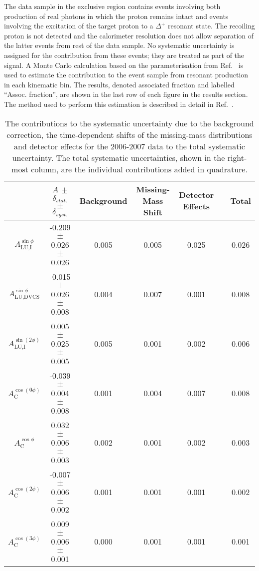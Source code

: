The data sample in the exclusive region contains events involving both
production of real photons in which the proton remains intact and
events involving the excitation of the target proton to a $\Delta^+$
resonant state. The recoiling proton is not detected and
  the calorimeter resolution does not allow separation of the latter events from rest of the data sample.
No systematic uncertainty is assigned for the contribution from these events; they are treated as part of the signal. A Monte Carlo calculation based on the parameterisation from Ref.~\cite{Bra76} is used to estimate the contribution to the event sample from resonant production in each kinematic bin. The results, denoted associated fraction and labelled ``Assoc. fraction'', are shown in the last row of each figure in the results section. The method used to perform this estimation is described in detail in
Ref.~\cite{Air08}.

\begin{table}
 \begin{center}
\resizebox{\textwidth}{!} {
 \begin{tabular}{|c|c|c|c|c|c|c|}
  \hline
 & $A$ $\pm$ $\delta_{stat.}$ $\pm$ $\delta_{syst.}$ & Background & Missing-Mass Shift  & Detector Effects & & Total \\
  \hline
  \hline
  $A_{\textrm{LU,I}}^{\sin\phi}$ & -0.209  $\pm$  0.026  $\pm$   0.026 & 0.005 & 0.005 & 0.025 & & 0.026 \\
  \hline
  $A_{\textrm{LU,DVCS}}^{\sin\phi}$ & -0.015  $\pm$  0.026  $\pm$  0.008 & 0.004 & 0.007 & 0.001 & & 0.008 \\
  \hline
  $A_{\textrm{LU,I}}^{\sin(2\phi)}$ & 0.005  $\pm$  0.025  $\pm$   0.005 & 0.005 & 0.001 & 0.002 & & 0.006 \\
  \hline
  \hline
  $A_{\textrm{C}}^{\cos(0\phi)}$ & -0.039 $\pm$  0.004 $\pm$  0.008 & 0.001 & 0.004 & 0.007 & & 0.008 \\
  \hline
  $A_{\textrm{C}}^{\cos\phi}$ & 0.032  $\pm$  0.006 $\pm$   0.003 & 0.002 & 0.001 & 0.002 & & 0.003 \\
  \hline
  $A_{\textrm{C}}^{\cos(2\phi)}$ & -0.007  $\pm$  0.006  $\pm$   0.002 & 0.001 & 0.001 & 0.001 & & 0.002 \\
  \hline
  $A_{\textrm{C}}^{\cos(3\phi)}$ & 0.009  $\pm$   0.006   $\pm$   0.001 & 0.000 & 0.001 & 0.001 & & 0.001 \\
  \hline
 \end{tabular}
}
  \caption{The contributions to the systematic uncertainty due to the
background correction, the time-dependent shifts of the missing-mass
distributions and detector effects for the 2006-2007 data to the total
systematic uncertainty. The total systematic uncertainties, shown in the
right-most column, are the individual contributions added in quadrature.}
  \label{table_systematic_contributions_0607}
\end{center}
\end{table}

